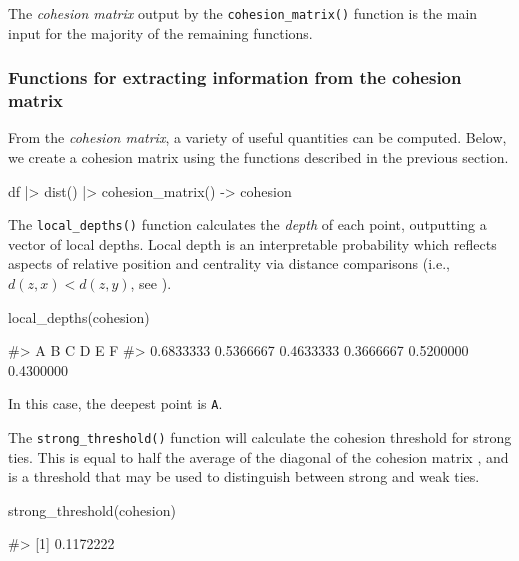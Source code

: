 The \emph{cohesion matrix} output by the \texttt{cohesion\_matrix()}
function is the main input for the majority of the remaining functions.

\hypertarget{functions-for-extracting-information-from-the-cohesion-matrix}{%
\subsubsection{Functions for extracting information from the cohesion
matrix}\label{functions-for-extracting-information-from-the-cohesion-matrix}}

From the \emph{cohesion matrix}, a variety of useful quantities can be
computed. Below, we create a cohesion matrix using the functions
described in the previous section.

\begin{Schunk}
\begin{Sinput}
df |>
  dist() |>
  cohesion_matrix() -> cohesion
\end{Sinput}
\end{Schunk}

The \texttt{local\_depths()} function calculates the \emph{depth} of
each point, outputting a vector of local depths. Local depth is an
interpretable probability which reflects aspects of relative position
and centrality via distance comparisons (i.e., \(d(z, x) < d(z, y)\),
see \citet{berenhaut2022social}).

\begin{Schunk}
\begin{Sinput}
local_depths(cohesion)
\end{Sinput}
\begin{Soutput}
#>         A         B         C         D         E         F 
#> 0.6833333 0.5366667 0.4633333 0.3666667 0.5200000 0.4300000
\end{Soutput}
\end{Schunk}

In this case, the deepest point is \texttt{A}.

The \texttt{strong\_threshold()} function will calculate the cohesion
threshold for strong ties. This is equal to half the average of the
diagonal of the cohesion matrix \citep{berenhaut2022social}, and is a
threshold that may be used to distinguish between strong and weak ties.

\begin{Schunk}
\begin{Sinput}
strong_threshold(cohesion)
\end{Sinput}
\begin{Soutput}
#> [1] 0.1172222
\end{Soutput}
\end{Schunk}

